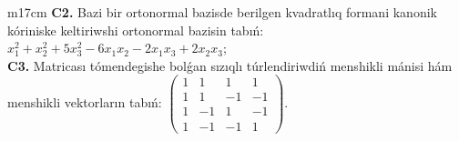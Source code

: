\documentclass{article}
\begin{document}
\begin{tabular}{m{17cm}}
\textbf{C2.} Bazi bir ortonormal bazisde berilgen kvadratlıq formani kanonik kóriniske keltiriwshi ortonormal bazisin tabıń: \(x_{1}^{2} + x_{2}^{2} + 5x_{3}^{2} - 6x_{1}x_{2} - 2x_{1}x_{3} + 2x_{2}x_{3}\); \\
\textbf{C3.} Matricası tómendegishe bolǵan sızıqlı túrlendiriwdiń menshikli mánisi hám menshikli vektorların tabıń: \(\begin{pmatrix} 1 & 1 & 1 & 1 \\ 1 & 1 & - 1 & - 1 \\ 1 & - 1 & 1 & - 1 \\ 1 & - 1 & - 1 & 1 \end{pmatrix}\). \\

\end{tabular}
\vspace{1cm}
\end{document}
